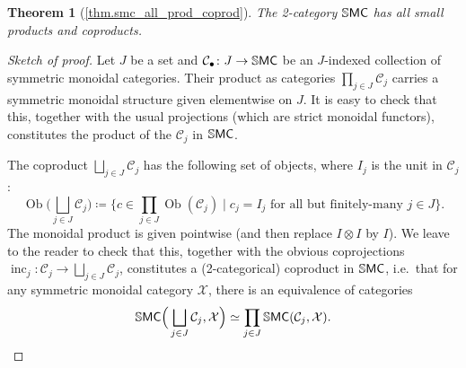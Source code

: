 \documentclass[11pt, oneside, article]{memoir}
\theoremstyle{plain}
\newtheorem*{theorem*}{Theorem}
\theoremstyle{definition}
\theoremstyle{remark}
\newcommand{\Set}[1]{\mathrm{#1}}%
\newcommand{\cat}[1]{\mathcal{#1}}%
\newcommand{\Cat}[1]{{\mathsf{#1}}}%
\newcommand{\CCat}[1]{\mathbb{\StrLeft{#1}{1}}\Cat{\StrGobbleLeft{#1}{1}}}%
\DeclareMathOperator{\ob}{\Set{Ob}}
\DeclareMathOperator{\inc}{inc}
\newcommand{\ssmc}{\CCat{SMC}}
\begin{document}
\begin{theorem*}[\ref{thm.smc_all_prod_coprod}]\label{page.smc_all_prod_coprod}
The 2-category $\ssmc$ has all small products and coproducts.
\end{theorem*}
\begin{proof}[Sketch of proof]
Let $J$ be a set and $\cat{C}_\bullet\colon J\to\ssmc$ be an $J$-indexed collection of symmetric monoidal categories. Their product as categories $\prod_{j\in J}\cat{C}_j$ carries a symmetric monoidal structure given elementwise on $J$. It is easy to check that this, together with the usual projections (which are strict monoidal functors), constitutes the product of the $\cat{C}_j$ in $\ssmc$.

The coproduct $\bigsqcup_{j\in J}\cat{C}_j$ has the following set of objects, where $I_j$ is the unit in $\cat{C}_j$:
\[
\ob\bigg(\bigsqcup_{j\in J}\cat{C}_j\bigg)\coloneqq
\bigg\{
c\in\prod_{j\in J}\ob(\cat{C}_j)
\;\bigg|\;
c_j=I_j\text{ for all but finitely-many }j\in J
\bigg\}.
\]
The monoidal product is given pointwise (and then replace $I\otimes I$ by $I$). We leave to the reader to check that this, together with the obvious coprojections $\inc_j\colon\cat{C}_j\to\bigsqcup_{j\in J}\cat{C}_j$, constitutes a (2-categorical) coproduct in $\ssmc$, i.e.\ that for any symmetric monoidal category $\cat{X}$, there is an equivalence of categories
\[
  \ssmc\Big(\bigsqcup_{j\in J}\cat{C}_j,\cat{X}\Big)\simeq\prod_{j\in J}\ssmc(\cat{C}_j,\cat{X}).
\qedhere
\]
\end{proof}
\end{document}
